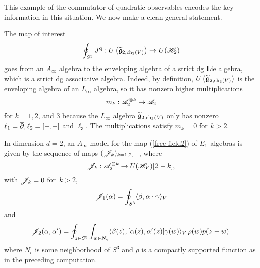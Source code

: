 This example of the commutator of quadratic observables encodes the key information in this situation.
We now make a clean general statement.

The map of interest
\[
\oint_{S^3} J^{\rm q} : U\left(\widetilde{\mathfrak g}_{2, {\rm ch}_3(V)}\right) \to U(\mathscr H_{2})
\] 
goes from an $A_\infty$ algebra to the enveloping algebra of a strict dg Lie algebra, which is a strict dg associative algebra. 
Indeed, by definition, $U\left(\widetilde{\mathfrak g}_{2, {\rm ch}_3(V)}\right)$ is the enveloping algebra of an $L_\infty$ algebra, so it has nonzero higher multiplications
\[
m_k : \mathscr A_2^{\otimes k} \to \mathscr A_2 
\] 
for $k = 1, 2$, and $3$ because the $L_\infty$ algebra $\widetilde{\mathfrak g}_{2, {\rm ch}_3(V)}$ only has nonzero $\ell_1 = \overline{\partial}, \ell_2 = [-.-]$ and $\ell_3$. 
The multiplications satisfy $m_k = 0$ for $k > 2$. 

\begin{prop}\label{prop: ainfinty}
In dimension $d = 2$, an $A_\infty$ model for the map (\ref{free field2}) of $E_1$-algebras is given by the sequence of maps $(\mathscr J_k)_{k = 1,2,\ldots}$, where
\[
\mathscr J_k : \mathscr A_2^{\otimes k} \to U(\mathscr H_V)[2-k],
\]
with $\mathscr J_k = 0$ for~$k > 2$,
\[
\mathscr J_1 (\alpha) = \oint_{S^3} \langle\beta, \alpha \cdot \gamma\rangle_V
\]
and 
\[
\mathscr J_2 (\alpha, \alpha') = \oint_{z \in S^3} \int_{w \in N_{\epsilon}}  \langle\beta(z), [\alpha(z),\alpha'(z)] \gamma(w) \rangle_V \, \rho(w) p(z-w) .
\] 
where $N_\epsilon$ is some neighborhood of $S^3$ and $\rho$ is a compactly supported function as in the  preceding computation. 
\end{prop}

